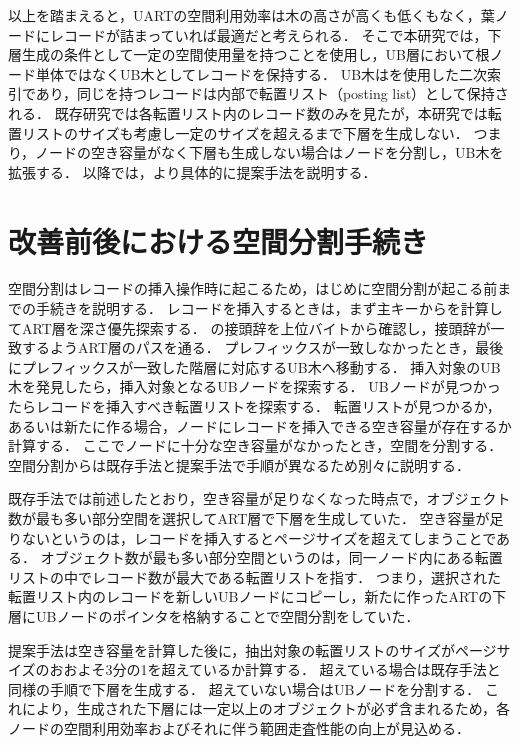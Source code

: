 以上を踏まえると，UARTの空間利用効率は木の高さが高くも低くもなく，葉ノードにレコードが詰まっていれば最適だと考えられる．
そこで本研究では，下層生成の条件として一定の空間使用量を持つことを使用し，UB層において根ノード単体ではなくUB木としてレコードを保持する．
UB木は\ZValue を使用した二次索引であり，同じ\ZValue を持つレコードは内部で転置リスト（posting list）として保持される．
既存研究では各転置リスト内のレコード数のみを見たが，本研究では転置リストのサイズも考慮し一定のサイズを超えるまで下層を生成しない．
つまり，ノードの空き容量がなく下層も生成しない場合はノードを分割し，UB木を拡張する．
以降では，より具体的に提案手法を説明する．

\section{改善前後における空間分割手続き}

空間分割はレコードの挿入操作時に起こるため，はじめに空間分割が起こる前までの手続きを説明する．
レコードを挿入するときは，まず主キーから\ZValue を計算してART層を深さ優先探索する．
\ZValue の接頭辞を上位バイトから確認し，接頭辞が一致するようART層のパスを通る．
プレフィックスが一致しなかったとき，最後にプレフィックスが一致した階層に対応するUB木へ移動する．
挿入対象のUB木を発見したら，挿入対象となるUBノードを探索する．
UBノードが見つかったらレコードを挿入すべき転置リストを探索する．
転置リストが見つかるか，あるいは新たに作る場合，ノードにレコードを挿入できる空き容量が存在するか計算する．
ここでノードに十分な空き容量がなかったとき，空間を分割する．
空間分割からは既存手法と提案手法で手順が異なるため別々に説明する．

既存手法では前述したとおり，空き容量が足りなくなった時点で，オブジェクト数が最も多い部分空間を選択してART層で下層を生成していた．
空き容量が足りないというのは，レコードを挿入するとページサイズを超えてしまうことである．
オブジェクト数が最も多い部分空間というのは，同一ノード内にある転置リストの中でレコード数が最大である転置リストを指す．
つまり，選択された転置リスト内のレコードを新しいUBノードにコピーし，新たに作ったARTの下層にUBノードのポインタを格納することで空間分割をしていた．

提案手法は空き容量を計算した後に，抽出対象の転置リストのサイズがページサイズのおおよそ3分の1を超えているか計算する．
超えている場合は既存手法と同様の手順で下層を生成する．
超えていない場合はUBノードを分割する．
これにより，生成された下層には一定以上のオブジェクトが必ず含まれるため，各ノードの空間利用効率およびそれに伴う範囲走査性能の向上が見込める．








